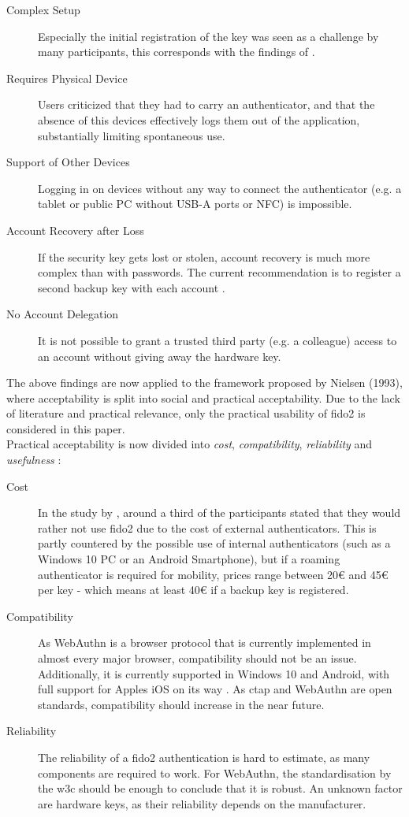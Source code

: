 \begin{description}
    \item[Complex Setup] Especially the initial registration of the key was seen as a challenge by many participants, this corresponds with the findings of \cite{das2018}.
    \item[Requires Physical Device] Users criticized that they had to carry an authenticator, and that the absence of this devices effectively logs them out of the application, substantially limiting spontaneous use.
    \item[Support of Other Devices] Logging in on devices without any way to connect the authenticator (e.g. a tablet or public PC without USB-A ports or NFC) is impossible.
    \item[Account Recovery after Loss] If the security key gets lost or stolen, account recovery is much more complex than with passwords. The current recommendation is to register a second backup key with each account \cite{gomi2019}.
    \item[No Account Delegation] It is not possible to grant a trusted third party (e.g. a colleague) access to an account without giving away the hardware key.
\end{description}

The above findings are now applied to the framework proposed by Nielsen (1993), where acceptability is split into social and practical acceptability. Due to the lack of literature and practical relevance, only the practical usability of \ac{fido2} is considered in this paper.\\
Practical acceptability is now divided into \emph{cost}, \emph{compatibility}, \emph{reliability} and \emph{usefulness} \cite[25 \psq]{nielsen1993}:

\begin{description}
    \item[Cost] In the study by \cite{lyastani2020}, around a third of the participants stated that they would rather not use \ac{fido2} due to the cost of external authenticators. This is partly countered by the possible use of internal authenticators (such as a Windows 10 PC or an Android Smartphone), but if a roaming authenticator is required for mobility, prices range between 20€ and 45€ per key \cite{yubikey_5_nfc} - which means at least 40€ if a backup key is registered.
    \item[Compatibility] As WebAuthn is a browser protocol that is currently implemented in almost every major browser, compatibility should not be an issue. Additionally, it is currently supported in Windows 10 and Android, with full support for Apples iOS on its way \cite{nichols2020}. As \ac{ctap} and WebAuthn are open standards, compatibility should increase in the near future.
    \item[Reliability] The reliability of a \ac{fido2} authentication is hard to estimate, as many components are required to work. For WebAuthn, the standardisation by the \ac{w3c} should be enough to conclude that it is robust. An unknown factor are hardware keys, as their reliability depends on the manufacturer.
\end{description}

